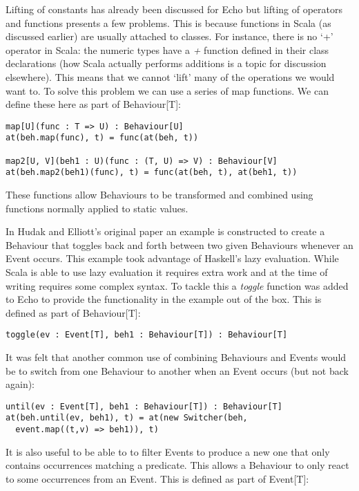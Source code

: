     Lifting of constants has already been discussed for Echo but lifting of operators and
    functions presents a few problems. This is because functions in Scala (as discussed earlier)
    are usually attached to classes. For instance, there is no `+' operator in Scala: the numeric
    types have a \emph{+} function defined in their class declarations (how Scala actually performs additions
    is a topic for discussion elsewhere). This means that we cannot `lift' many of the operations we
    would want to. To solve this problem we can use a series of map functions. We can define these
    here as part of Behaviour[T]:

\begin{verbatim}
map[U](func : T => U) : Behaviour[U]
at(beh.map(func), t) = func(at(beh, t))

map2[U, V](beh1 : U)(func : (T, U) => V) : Behaviour[V]
at(beh.map2(beh1)(func), t) = func(at(beh, t), at(beh1, t))
\end{verbatim}        

    These functions allow Behaviours to be transformed and combined using functions
    normally applied to static values.
    
    In Hudak and Elliott's original paper an example is constructed to create a Behaviour
    that toggles back and forth between two given Behaviours whenever an Event occurs. This
    example took advantage of Haskell's lazy evaluation. While Scala is able to use lazy evaluation
    it requires extra work and at the time of writing requires some complex syntax. To tackle this
    a \emph{toggle} function was added to Echo to provide the functionality in the example out of the box.
    This is defined as part of Behaviour[T]:
    
\begin{verbatim}
toggle(ev : Event[T], beh1 : Behaviour[T]) : Behaviour[T]
\end{verbatim}        
    
    It was felt that another common use of combining Behaviours and Events would be
    to switch from one Behaviour to another when an Event occurs (but not back again):

\begin{verbatim}
until(ev : Event[T], beh1 : Behaviour[T]) : Behaviour[T]
at(beh.until(ev, beh1), t) = at(new Switcher(beh, 
  event.map((t,v) => beh1)), t)
\end{verbatim}        
    
    It is also useful to be able to to filter Events to produce a new one that only
    contains occurrences matching a predicate. This allows a Behaviour to only react
    to some occurrences from an Event. This is defined as part of Event[T]:

